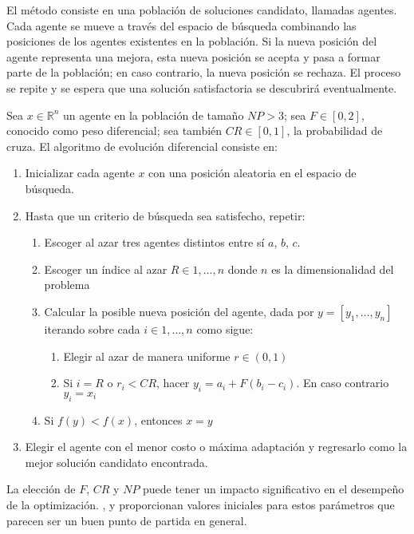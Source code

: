 El método consiste en una población de soluciones candidato, llamadas agentes. Cada agente se mueve a través del espacio de búsqueda combinando las posiciones de los agentes existentes en la población. Si la nueva posición del agente representa una mejora, esta nueva posición se acepta y pasa a formar parte de la población; en caso contrario, la nueva posición se rechaza. El proceso se repite y se espera que una solución satisfactoria se descubrirá eventualmente.

Sea $x \in \mathbb{R}^n$ un agente en la población de tamaño $NP>3$; sea $F \in [0,2]$, conocido como peso diferencial; sea también $CR \in [0,1]$, la probabilidad de cruza. El algoritmo de evolución diferencial consiste en:
\begin{enumerate}
\item Inicializar cada agente $x$ con una posición aleatoria en el espacio de búsqueda.
\item Hasta que un criterio de búsqueda sea satisfecho, repetir:
	\begin{enumerate}
		\item Escoger al azar tres agentes distintos entre sí $a$, $b$, $c$.
		\item Escoger un índice al azar $R \in {1,\ldots,n}$ donde $n$ es la dimensionalidad del problema
		\item Calcular la posible nueva posición del agente, dada por $y=[y_1,\ldots,y_n]$ iterando sobre cada $i \in {1,\ldots,n}$ como sigue:
			\begin{enumerate}
				\item Elegir al azar de manera uniforme $r \in (0,1)$
				\item Si $i=R$ o $r_i<CR$, hacer $y_i=a_i+F(b_i-c_i)$. En caso contrario $y_i=x_i$
			\end{enumerate}
		\item Si $f(y)<f(x)$, entonces $x=y$
	\end{enumerate}
\item Elegir el agente con el menor costo o máxima adaptación y regresarlo como la mejor solución candidato encontrada.
\end{enumerate}

La elección de $F$, $CR$ y $NP$ puede tener un impacto significativo en el desempeño de la optimización. \citeauthor{Storn1997}  \citep{Storn1997}, y \citeauthor{lampinen2002} \citep{lampinen2002} proporcionan valores iniciales para estos parámetros que parecen ser un buen punto de partida en general.



